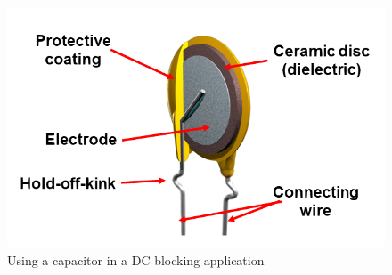 \begin{figure}
\includegraphics[keepaspectratio=true,scale=.5]{./figures/dcBlock.png}
\centering
\caption{Using a capacitor in a DC blocking application}
\label{dcBlock}
\end{figure}
